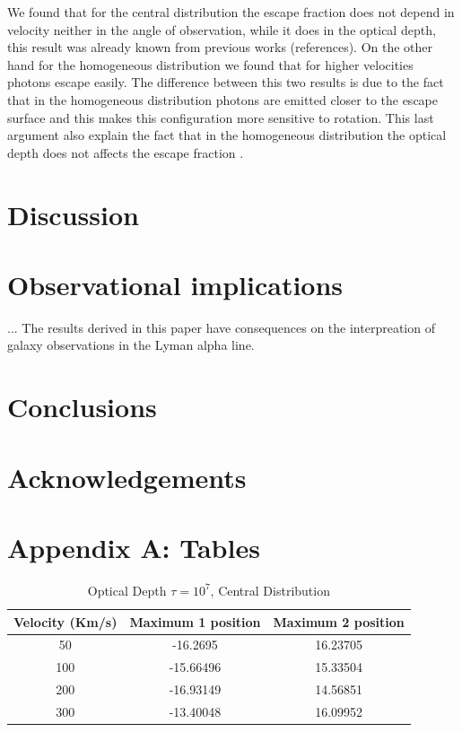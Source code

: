 \documentclass[usenatbib]{mn2e}
\begin{document}
We found that for the central distribution the escape fraction does not depend in velocity neither in the angle of observation, while it does in the optical depth, this result was already known from previous works (references). On the other hand for the homogeneous distribution we found that for higher velocities photons escape easily. The difference between this two results is due to the fact that in the homogeneous distribution photons are emitted closer to the escape surface and this makes this configuration more sensitive to rotation. This last argument also explain the fact that in the homogeneous distribution the optical depth does not affects the escape fraction .



\section{Discussion}
\label{sec:discussion}

\section{Observational implications}

... The results derived in this paper have consequences on the
interpreation of galaxy observations in the Lyman alpha line.

\section{Conclusions}

\section*{Acknowledgements}

\section*{Appendix A: Tables}

\begin{table}
\begin{center}
\begin{tabular}{ccc}\hline          
Velocity (Km/s) & Maximum 1 position & Maximum 2 position \\ \hline
50 & -16.2695 & 16.23705 \\ 
100 & -15.66496 & 15.33504 \\ 
200 & -16.93149 & 14.56851 \\ 
300 & -13.40048 & 16.09952 \\ \hline 
\end{tabular} 
\caption{Optical Depth $\tau= 10^{7}$, Central Distribution}
\end{center}
\end{table}
\end{document}
